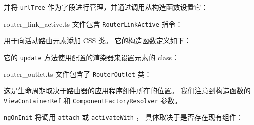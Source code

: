 
并将 \texttt{urlTree} 作为字段进行管理，并通过调用从构造函数设置它：




router\_link\_active.ts 文件包含 \texttt{RouterLinkActive} 指令：




用于向活动路由元素添加 CSS 类。
它的构造函数定义如下：




它的 \texttt{update} 方法使用配置的渲染器来设置元素的 class：




router\_outlet.ts 文件包含了 \texttt{RouterOutlet} 类：




这是生命周期取决于路由器的应用程序组件所在的位置。
我们注意到构造函数的
\texttt{ViewContainerRef}  和
\texttt{ComponentFactoryResolver}  参数。


\texttt{ngOnInit} 将调用
\texttt{attach}  或 \texttt{activateWith} ，
具体取决于是否存在现有组件：




